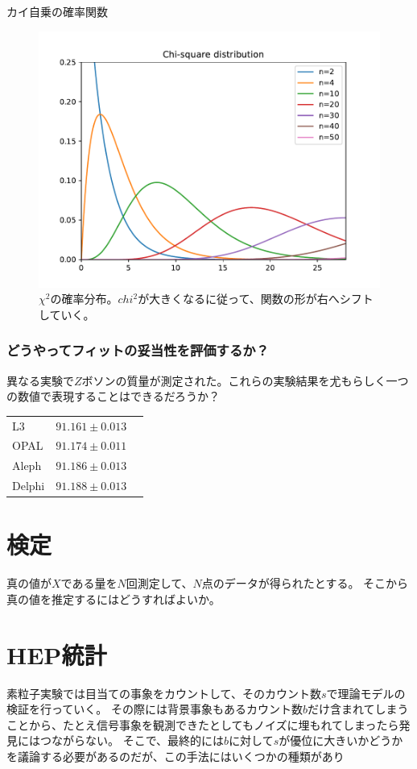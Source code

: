 \documentclass[oneside, uplatex]{jsbook}
\begin{document}
カイ自乗の確率関数

\begin{figure}[h]
  \centering
  \includegraphics[scale=0.5]{python/ChiSquareDistribution.pdf}
  \caption{$\chi^2$の確率分布。$chi^2$が大きくなるに従って、関数の形が右へシフトしていく。}
\end{figure}


\subsection{どうやってフィットの妥当性を評価するか？}
異なる実験で$Z$ボソンの質量が測定された。これらの実験結果を尤もらしく一つの数値で表現することはできるだろうか？

\begin{table}
  \centering
  \begin{tabular}{lll}
    L3        & $91.161 \pm 0.013$   \\
    OPAL      & $91.174 \pm 0.011$    \\
    Aleph       & $91.186 \pm 0.013$ \\
    Delphi      & $91.188 \pm 0.013$
  \end{tabular}
\end{table}

\chapter{検定}
真の値が$X$である量を$N$回測定して、$N$点のデータが得られたとする。
そこから真の値を推定するにはどうすればよいか。

\chapter{HEP統計}
素粒子実験では目当ての事象をカウントして、そのカウント数$s$で理論モデルの検証を行っていく。
その際には背景事象もあるカウント数$b$だけ含まれてしまうことから、たとえ信号事象を観測できたとしてもノイズに埋もれてしまったら発見にはつながらない。
そこで、最終的には$b$に対して$s$が優位に大きいかどうかを議論する必要があるのだが、この手法にはいくつかの種類があり
\end{document}
